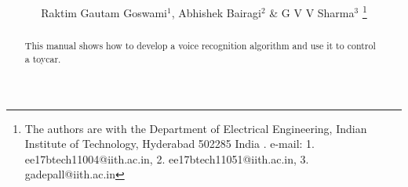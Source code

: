 \documentclass[journal,12pt,twocolumn]{IEEEtran}
\begin{document}
\let\StandardTheFigure\thefigure
\let\vec\mathbf
\renewcommand{\thefigure}{\theproblem}



\def\putbox#1#2#3{\makebox[0in][l]{\makebox[#1][l]{}\raisebox{\baselineskip}[0in][0in]{\raisebox{#2}[0in][0in]{#3}}}}
     \def\rightbox#1{\makebox[0in][r]{#1}}
     \def\centbox#1{\makebox[0in]{#1}}
     \def\topbox#1{\raisebox{-\baselineskip}[0in][0in]{#1}}
     \def\midbox#1{\raisebox{-0.5\baselineskip}[0in][0in]{#1}}

\vspace{3cm}

\title{ 
}
\author{Raktim Gautam Goswami$^{1}$, Abhishek Bairagi$^{2}$ \& G V V Sharma$^{3}$ 
\thanks{The authors are with the Department
of Electrical Engineering, Indian Institute of Technology, Hyderabad
502285 India .  e-mail: 1. ee17btech11004@iith.ac.in, 2. ee17btech11051@iith.ac.in,  
3. gadepall@iith.ac.in}%
}




\maketitle


\tableofcontents

\renewcommand{\thefigure}{\theenumi}
\renewcommand{\thetable}{\theenumi}


\bigskip

\begin{abstract}
%
This manual shows how to develop a voice recognition algorithm and use it to 
control a toycar. 
%
\end{abstract}
\end{document}
